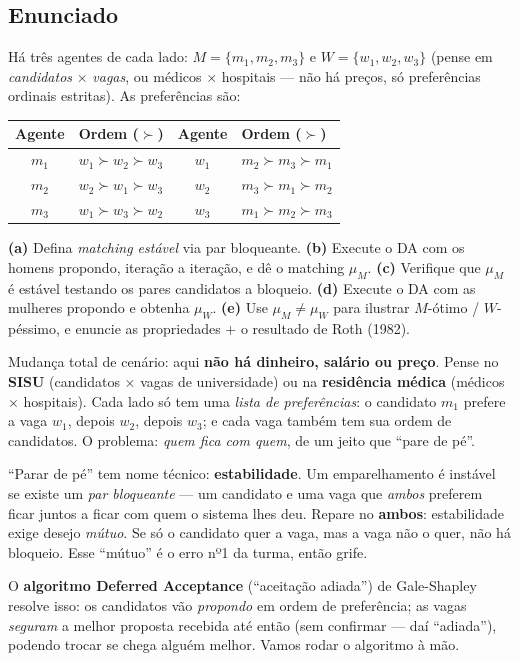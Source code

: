 \documentclass[11pt,a4paper]{article}
\newif\ifsolucao
\begin{document}
\subsection*{Enunciado}
Há três agentes de cada lado: $M=\{m_1,m_2,m_3\}$ e $W=\{w_1,w_2,w_3\}$ (pense em
\emph{candidatos} $\times$ \emph{vagas}, ou médicos $\times$ hospitais — não há preços, só
preferências ordinais estritas). As preferências são:
\begin{center}\small
\begin{tabular}{@{}clcl@{}}
\toprule
Agente & Ordem ($\succ$) & Agente & Ordem ($\succ$) \\
\midrule
$m_1$ & $w_1 \succ w_2 \succ w_3$ & $w_1$ & $m_2 \succ m_3 \succ m_1$ \\
$m_2$ & $w_2 \succ w_1 \succ w_3$ & $w_2$ & $m_3 \succ m_1 \succ m_2$ \\
$m_3$ & $w_1 \succ w_3 \succ w_2$ & $w_3$ & $m_1 \succ m_2 \succ m_3$ \\
\bottomrule
\end{tabular}
\end{center}
\noindent\textbf{(a)} Defina \emph{matching estável} via par bloqueante. \textbf{(b)} Execute o
DA com os homens propondo, iteração a iteração, e dê o matching $\mu_M$. \textbf{(c)} Verifique
que $\mu_M$ é estável testando os pares candidatos a bloqueio. \textbf{(d)} Execute o DA com as
mulheres propondo e obtenha $\mu_W$. \textbf{(e)} Use $\mu_M\ne\mu_W$ para ilustrar
$M$-ótimo / $W$-péssimo, e enuncie as propriedades + o resultado de Roth (1982).

\ifsolucao

\begin{empalavras}
Mudança total de cenário: aqui \textbf{não há dinheiro, salário ou preço}. Pense no
\textbf{SISU} (candidatos $\times$ vagas de universidade) ou na \textbf{residência médica}
(médicos $\times$ hospitais). Cada lado só tem uma \emph{lista de preferências}: o candidato
$m_1$ prefere a vaga $w_1$, depois $w_2$, depois $w_3$; e cada vaga também tem sua ordem de
candidatos. O problema: \emph{quem fica com quem}, de um jeito que ``pare de pé''.

\smallskip\noindent
``Parar de pé'' tem nome técnico: \textbf{estabilidade}. Um emparelhamento é instável se existe
um \emph{par bloqueante} — um candidato e uma vaga que \emph{ambos} preferem ficar juntos a
ficar com quem o sistema lhes deu. Repare no \textbf{ambos}: estabilidade exige desejo
\emph{mútuo}. Se só o candidato quer a vaga, mas a vaga não o quer, não há bloqueio. Esse
``mútuo'' é o erro nº1 da turma, então grife.

\smallskip\noindent
O \textbf{algoritmo Deferred Acceptance} (``aceitação adiada'') de Gale-Shapley resolve isso:
os candidatos vão \emph{propondo} em ordem de preferência; as vagas \emph{seguram} a melhor
proposta recebida até então (sem confirmar — daí ``adiada''), podendo trocar se chega alguém
melhor. Vamos rodar o algoritmo à mão.
\end{empalavras}
\end{document}
